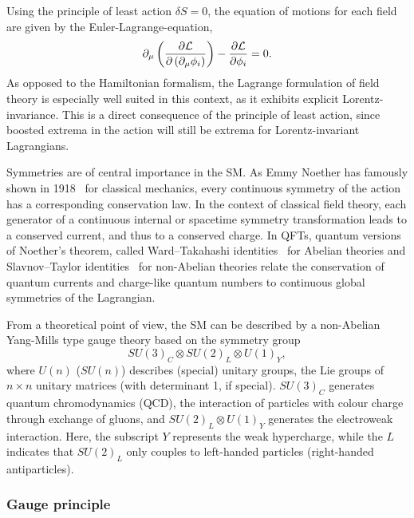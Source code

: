 Using the principle of least action $\delta S = 0$, the equation of motions for each field are given by the Euler-Lagrange-equation,
\begin{equation}
	\partial_\mu\left(\frac{\partial\mathcal{L}}{\partial\left(\partial_\mu\phi_i\right)}\right)-\frac{\partial\mathcal{L}}{\partial\phi_i}=0.
	\label{eq:euler_lagrange}
\end{equation}
As opposed to the Hamiltonian formalism, the Lagrange formulation of field theory is especially well suited in this context, as it exhibits explicit Lorentz-invariance. This is a direct consequence of the principle of least action, since boosted extrema in the action will still be extrema for Lorentz-invariant Lagrangians.


Symmetries are of central importance in the SM. As Emmy Noether has famously shown in 1918~\cite{physics/0503066} for classical mechanics, every continuous symmetry of the action has a corresponding conservation law. In the context of classical field theory, each generator of a continuous internal or spacetime symmetry transformation leads to a conserved current, and thus to a conserved charge. In QFTs, quantum versions of Noether's theorem, called Ward–Takahashi identities~\cite{PhysRev.78.182,Takahashi1957} for Abelian theories and Slavnov–Taylor identities~\cite{THOOFT1971173,TAYLOR1971436,Slavnov1972} for non-Abelian theories relate the conservation of quantum currents and charge-like quantum numbers to continuous global symmetries of the Lagrangian.

From a theoretical point of view, the SM can be described by a non-Abelian Yang-Mills type  gauge theory based on the symmetry group
\begin{equation*}
	SU(3)_C \otimes SU(2)_L \otimes U(1)_Y,
\end{equation*}
where $U(n)$ ($SU(n)$) describes (special) unitary groups, \ie the Lie groups of $n\times n$ unitary matrices (with determinant 1, if special). $SU(3)_C$ generates quantum chromodynamics (QCD), \ie the interaction of particles with colour charge through exchange of gluons, and $SU(2)_L \otimes U(1)_Y$ generates the electroweak interaction. Here, the subscript $Y$ represents the weak hypercharge, while the $L$ indicates that $SU(2)_L$ only couples to left-handed particles (right-handed antiparticles).


\subsubsection{Gauge principle}

